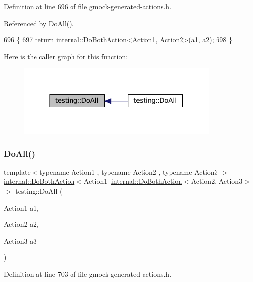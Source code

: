 Definition at line 696 of file gmock-\/generated-\/actions.\+h.



Referenced by Do\+All().


\begin{DoxyCode}
696                               \{
697   \textcolor{keywordflow}{return} internal::DoBothAction<Action1, Action2>(a1, a2);
698 \}
\end{DoxyCode}
Here is the caller graph for this function\+:
\nopagebreak
\begin{figure}[H]
\begin{center}
\leavevmode
\includegraphics[width=282pt]{namespacetesting_a5f533932753d2af95000e96c4a3042e3_icgraph}
\end{center}
\end{figure}
\mbox{\label{namespacetesting_ad6a3ce5e229120ea287286a86394d712}} 
\subsubsection{\texorpdfstring{Do\+All()}{DoAll()}\hspace{0.1cm}{\footnotesize\ttfamily [2/9]}}
{\footnotesize\ttfamily template$<$typename Action1 , typename Action2 , typename Action3 $>$ \\
\hyperlink{classtesting_1_1internal_1_1DoBothAction}{internal\+::\+Do\+Both\+Action}$<$Action1, \hyperlink{classtesting_1_1internal_1_1DoBothAction}{internal\+::\+Do\+Both\+Action}$<$Action2, Action3$>$ $>$ testing\+::\+Do\+All (\begin{DoxyParamCaption}\item[{Action1}]{a1,  }\item[{Action2}]{a2,  }\item[{Action3}]{a3 }\end{DoxyParamCaption})\hspace{0.3cm}{\ttfamily [inline]}}



Definition at line 703 of file gmock-\/generated-\/actions.\+h.



